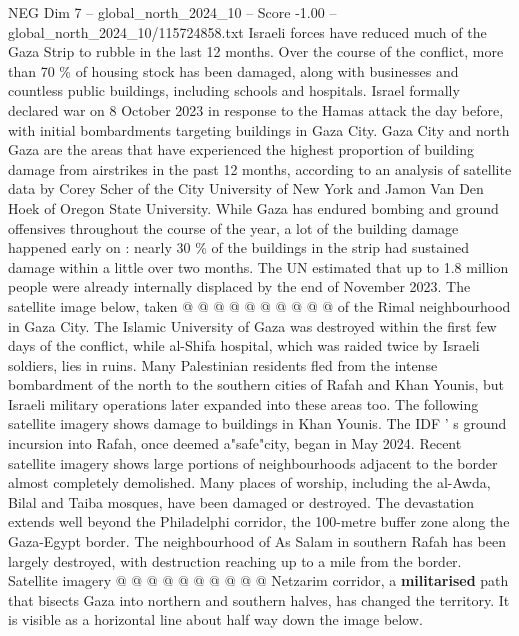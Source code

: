 \begin{textsample}{NEG Dim 7 – global\_north\_2024\_10 – Score -1.00 – global\_north\_2024\_10/115724858.txt}  \label{ex:f7_neg_362}
Israeli forces have reduced much of the Gaza Strip to rubble in the last 12 months.
Over the course of the conflict, more than 70 \% of housing stock has been damaged, along with businesses and countless public buildings, including schools and hospitals.
Israel formally declared war on 8 October 2023 in response to the Hamas attack the day before, with initial bombardments targeting buildings in Gaza City.
Gaza City and north Gaza are the areas that have experienced the highest proportion of building damage from airstrikes in the past 12 months, according to an analysis of satellite data by Corey Scher of the City University of New York and Jamon Van Den Hoek of Oregon State University.
While Gaza has endured bombing and ground offensives throughout the course of the year, a lot of the building damage happened early on : nearly 30 \% of the buildings in the strip had sustained damage within a little over two months.
The UN estimated that up to 1.8 million people were already internally displaced by the end of November 2023.
The satellite image below, taken @ @ @ @ @ @ @ @ @ @ of the Rimal neighbourhood in Gaza City.
The Islamic University of Gaza was destroyed within the first few days of the conflict, while al-Shifa hospital, which was raided twice by Israeli soldiers, lies in ruins.
Many Palestinian residents fled from the intense bombardment of the north to the southern cities of Rafah and Khan Younis, but Israeli military operations later expanded into these areas too.
The following satellite imagery shows damage to buildings in Khan Younis.
The IDF ' s ground incursion into Rafah, once deemed a"safe"city, began in May 2024.
Recent satellite imagery shows large portions of neighbourhoods adjacent to the border almost completely demolished.
Many places of worship, including the al-Awda, Bilal and Taiba mosques, have been damaged or destroyed.
The devastation extends well beyond the Philadelphi corridor, the 100-metre buffer zone along the Gaza-Egypt border.
The neighbourhood of As Salam in southern Rafah has been largely destroyed, with destruction reaching up to a mile from the border.
Satellite imagery @ @ @ @ @ @ @ @ @ @ Netzarim corridor, a \textbf{militarised} path that bisects Gaza into northern and southern halves, has changed the territory.
It is visible as a horizontal line about half way down the image below.

\end{textsample}

